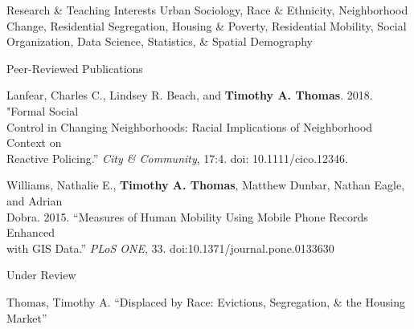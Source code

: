 \documentclass{resume} %
\begin{document}

\begin{rSection}{Research \& Teaching Interests}
\vspace{5mm}
Urban Sociology, Race \& Ethnicity, Neighborhood Change, Residential Segregation, Housing \& Poverty, Residential Mobility, Social Organization, Data Science, Statistics, \& Spatial Demography
\vspace{5mm}
\end{rSection}

\pagebreak
\begin{rSection}{Peer-Reviewed Publications}
\vspace{5mm}

Lanfear, Charles C., Lindsey R. Beach, and \textbf{Timothy A. Thomas}. 2018. "Formal Social\\
		 \hspace*{.25in}Control in Changing Neighborhoods: Racial Implications of Neighborhood Context on\\
		 \hspace*{.25in}Reactive Policing.'' \textit{City \& Community}, 17:4. doi: 10.1111/cico.12346.

Williams, Nathalie E., \textbf{Timothy A. Thomas}, Matthew Dunbar, Nathan Eagle, and Adrian\\
		 \hspace*{.25in}Dobra. 2015. ``Measures of Human Mobility Using Mobile Phone Records Enhanced\\
		 \hspace*{.25in}with GIS Data.'' \textit{PLoS ONE}, 33. doi:10.1371/journal.pone.0133630
\vspace{5mm}
\end{rSection}


% 

\begin{rSection}{Under Review}
\vspace{5mm}

Thomas, Timothy A. ``Displaced by Race: Evictions, Segregation, \& the Housing Market''

\vspace{5mm}
\end{rSection}
\end{document}
